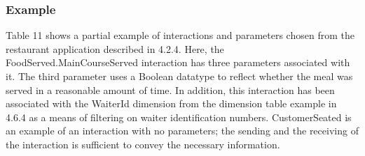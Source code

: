 \vspace{-11pt}

\subsubsection{Example}
Table 11 shows a partial example of interactions and parameters chosen from the restaurant application described in 4.2.4. Here, the FoodServed.MainCourseServed interaction has three parameters associated with it. The third parameter uses a Boolean datatype to reflect whether the meal was served in a reasonable amount of time. In addition, this interaction has been associated with the WaiterId dimension from the dimension table example in 4.6.4 as a means of filtering on waiter identification numbers. CustomerSeated is an example of an interaction with no parameters; the sending and the receiving of the interaction is sufficient to convey the necessary information.

\vspace{-7pt}
\begingroup
\fontsize{9}{10.9}\selectfont
\setlength{\tabcolsep}{3pt}
\renewcommand{\arraystretch}{1.50}
\noindent{}
\endgroup

